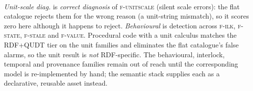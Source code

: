 \begin{table}[t]
\centering
\caption{E4b: is the guardrail gain from \emph{any} strong rule system, or from explicit semantics? A non-RDF procedural validator (G-proc) with a hard-coded unit-conversion table is compared against the flat catalogue and the two graph tiers.}
\label{tab:e4b-procedural}
\footnotesize
{}
\\[4pt]\begin{minipage}{\linewidth}\footnotesize \emph{Unit-scale diag.} is \emph{correct diagnosis} of \textsc{f-unitscale} (silent scale errors): the flat catalogue rejects them for the wrong reason (a unit-string mismatch), so it scores zero here although it happens to reject. \emph{Behavioural} is detection across \textsc{f-ilk}, \textsc{f-state}, \textsc{f-stale} and \textsc{f-value}. Procedural code with a unit calculus matches the RDF+QUDT tier on the unit families and eliminates the flat catalogue's false alarms, so the unit result is \emph{not} RDF-specific. The behavioural, interlock, temporal and provenance families remain out of reach until the corresponding model is re-implemented by hand; the semantic stack supplies each as a declarative, reusable asset instead.\end{minipage}
\end{table}
